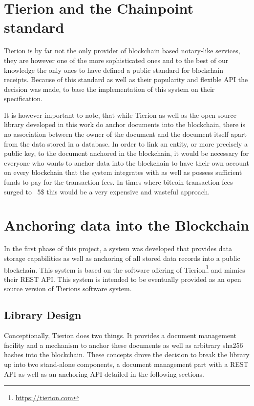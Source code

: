 \documentclass[12pt,msc,a4paper,oneside]{ucl_thesis}
\begin{document}
\section{Tierion and the Chainpoint standard}
Tierion is by far not the only provider of blockchain based notary-like services, they are however one of the more sophisticated ones and to the best of our knowledge the only ones to have defined a public standard for blockchain receipts. Because of this standard as well as their popularity and flexible API the decision was made, to base the implementation of this system on their specification.

It is however important to note, that while Tierion as well as the open source library developed in this work do anchor documents into the blockchain, there is no association between the owner of the document and the document itself apart from the data stored in a database. In order to link an entity, or more precisely a public key, to the document anchored in the blockchain, it would be necessary for everyone who wants to anchor data into the blockchain to have their own account on every blockchain that the system integrates with as well as possess sufficient funds to pay for the transaction fees. In times where bitcoin transaction fees surged to ~5\$ this would be a very expensive and wasteful approach.

\section{Anchoring data into the Blockchain} \label{sec:disclosure_anchor_data}
In the first phase of this project, a system was developed that provides data storage capabilities as well as anchoring of all stored data records into a public blockchain. This system is based on the software offering of Tierion\footnote{\url{https://tierion.com}} and mimics their REST API. This system is intended to be eventually provided as an open source version of Tierions software system.

\subsection{Library Design}
Conceptionally, Tierion does two things. It provides a document management facility and a mechanism to anchor these documents as well as arbitrary sha256 hashes into the blockchain. These concepts drove the decision to break the library up into two stand-alone components, a document management part with a REST API as well as an anchoring API detailed in the following sections.
\end{document}
